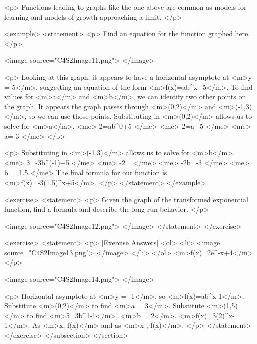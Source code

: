         <p>
            Functions leading to graphs like the one above are common as models for learning and models of growth approaching a limit.
        </p>

        <example>
            <statement>
                <p>
                    Find an equation for the function graphed here.
                </p>

                <image source="C4S2Image11.png">
                </image>

                <p>
                    Looking at this graph, it appears to have a horizontal asymptote at <m>y = 5</m>, suggesting an equation of the form <m>f(x)=ab^{x}+5</m>.
                    To find values for <m>a</m> and <m>b</m>, we can identify two other points on the graph.
                    It appears the graph passes through <m>(0,2)</m> and <m>(-1,3)</m>, so we can use those points.
                    Substituting in <m>(0,2)</m> allows us to solve for <m>a</m>.
                    <me>
                        2=ab^{0}+5
                    </me>
                    <me>
                        2=a+5
                    </me>
                    <me>
                        a=-3
                    </me>
                </p>

                <p>
                    Substituting in <m>(-1,3)</m> allows us to solve for <m>b</m>.
                    <me>
                        3=-3b^{(}-1)+5
                    </me>
                    <me>
                        -2=
                    </me>
                    <me>
                        -2b=-3
                    </me>
                    <me>
                        b==1.5
                    </me>
                    The final formula for our function is <m>f(x)=-3(1.5)^{x}+5</m>.
                </p>
            </statement>
        </example>

        <exercise>
            <statement>
                <p>
                    Given the graph of the transformed exponential function, find a formula and describe the long run behavior.
                </p>

                <image source="C4S2Image12.png">
                </image>
            </statement>
        </exercise>

        <exercise>
            <statement>
                <p>
                    [Exercise Answers]
                    <ol>
                        <li>
                            <image source="C4S2Image13.png">
                            </image>
                        </li>
                    </ol>
                    <m>f(x)=2e^{-x}+4</m>
                </p>

                <image source="C4S2Image14.png">
                </image>

                <p>
                    Horizontal asymptote at <m>y = -1</m>, so <m>f(x)=ab^{x}-1</m>.
                    Substitute <m>(0,2)</m> to find <m>a = 3</m>.
                    Substitute <m>(1,5)</m> to find <m>5=3b^{1}-1</m>, <m>b = 2</m>.
                    <m>f(x)=3(2)^{x}-1</m>.
                    As <m>x\to\infty, f(x)\to\infty</m> and as <m>x\to-\infty, f(x)</m>.
                </p>
            </statement>
        </exercise>
    </subsection>
</section>